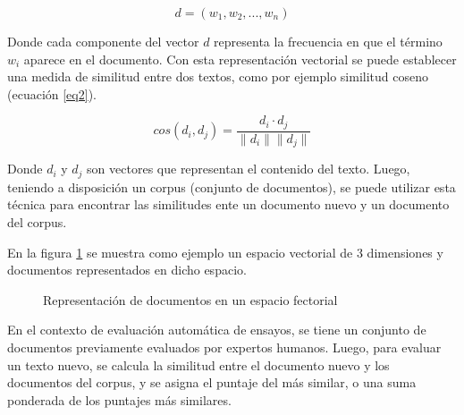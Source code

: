 \documentclass[12pt]{diicc}
\begin{document}
\begin{equation}
	\label{eq1}
	d = (w_1, w_2, ..., w_n)
\end{equation}

Donde cada componente del vector $d$ representa la frecuencia en que el término $w_i$ aparece en el documento. Con esta representación vectorial se puede establecer una medida de similitud entre dos textos, como por ejemplo similitud coseno (ecuación \ref{eq2}).

\begin{equation}
	\label{eq2}
	cos(d_i, d_j) = \frac{d_i\cdot d_j}{\|d_i\| \|d_j\|}
\end{equation}

Donde $d_i$ y $d_j$ son vectores que representan el contenido del texto. Luego, teniendo a disposición un corpus (conjunto de documentos), se puede utilizar esta técnica para encontrar las similitudes ente un documento nuevo y un documento del corpus.

En la figura \ref{fig_01} se muestra como ejemplo un espacio vectorial de 3 dimensiones y documentos representados en dicho espacio.

\begin{figure}[!htbp]
  \begin{center}
    \leavevmode
  \end{center}
  \caption{Representación de documentos en un espacio fectorial}
  \label{fig_01}
\end{figure}

En el contexto de evaluación automática de ensayos, se tiene un conjunto de documentos previamente evaluados por expertos humanos. Luego, para evaluar un texto nuevo, se calcula la similitud entre el documento nuevo y los documentos del corpus, y se asigna el puntaje del más similar, o una suma ponderada de los puntajes más similares.
\end{document}
